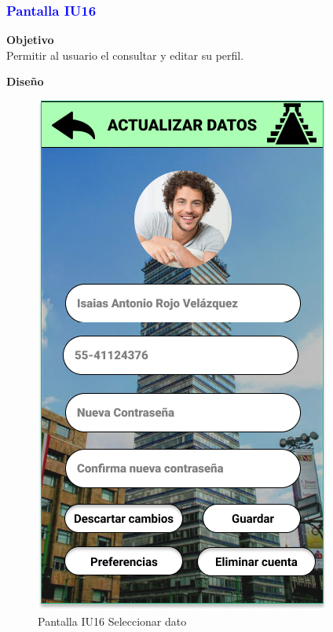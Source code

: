 \subsubsection{\textcolor{blue}{Pantalla IU16}}

\textbf{Objetivo} \\
Permitir al usuario el consultar y editar su perfil.
\vspace{15pt}

\textbf{Diseño}

    \begin{figure}[h]
        
            \centering
            \includegraphics[width=.4\linewidth]{Pantallas Prototipo3/IU16 Pantalla de seleccionar el dato a editar.jpg}
            \caption{Pantalla IU16 Seleccionar dato}
    
    \end{figure}





